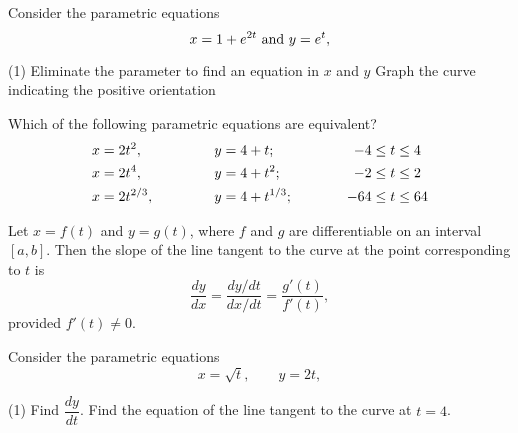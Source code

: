 \documentclass[../mathNotesPreamble]{subfiles}
\begin{document}
  \begin{ex*}[\textcolor{blue}{LC 32.5-32.7}]
    Consider the parametric equations
      \[x=1+e^{2t}\textnormal{ and } y=e^t,\]
  \end{ex*}
  \begin{tasks}[after-item-skip=\stretch{1}, label=,item-indent=0pt](1)
    \task Eliminate the parameter to find an equation in $x$ and $y$
    \task Graph the curve indicating the positive orientation
      \begin{center}
        \smash{\raisebox{-\height+\baselineskip}{
          \begin{tikzpicture}[scale=1.0]
            \begin{axis}[
              grid=both, %
              grid style={line width=0.3pt, draw=gray!60},
              major grid style={line width=0.375pt, draw=gray!75},
              minor grid style={line width=0.15pt, draw=gray!50},
              axis lines=center,
              axis line style={black,->},
              xmin=-6.5, xmax=6.5,
              ymin=-6.5, ymax=6.5,
              minor x tick num=1,
              minor y tick num=1,
              ticklabel style={font=\footnotesize,inner sep=1.15pt,fill=white,opacity=1.0, text opacity=1},
              every axis plot/.append style={line width=0.95pt, color=blue, samples=100}
              ]
            \end{axis}
          \end{tikzpicture}
        }}
      \end{center}
    \task Which of the following parametric equations are equivalent?
    \begingroup
    \addtolength{\jot}{5mm}
    \begin{alignat*}{3}
      x&=2t^2, \hspace*{15mm} &y&=4+t;\hspace*{15mm} &-4\leq{}& t\leq 4\\
      x&=2t^4, &y&=4+t^2; &-2\leq{}& t\leq 2\\
      x&=2t^{2/3}, &y&=4+t^{1/3}; &-64\leq{}& t\leq 64
    \end{alignat*}
    \endgroup
  \end{tasks}
  \pagebreak

  \begin{thmBox*}
    Let $x=f(t)$ and $y=g(t)$, where $f$ and $g$ are differentiable on an interval $[a,b]$. Then the slope of the line tangent to the curve at the point corresponding to $t$ is
      \[\frac{dy}{dx}=\frac{dy/dt}{dx/dt}=\frac{g'(t)}{f'(t)},\]
    provided $f'(t)\neq 0$.
  \end{thmBox*}
  \begin{ex*}[\textcolor{blue}{LC 32.8-32.9}]
    Consider the parametric equations
      \[x=\sqrt{t},\qquad y=2t,\]
  \end{ex*}
  \begin{tasks}[after-item-skip=\stretch{1}, label=,item-indent=0pt](1)
    \task Find $\dfrac{dy}{dt}$.
    \task Find the equation of the line tangent to the curve at $t=4$.
  \end{tasks}
  \pagebreak
\end{document}
